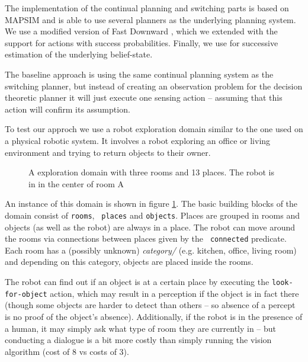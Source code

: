 

The implementation of the continual planning and switching parts is
based on MAPSIM \cite{brenner:nebel:jaamas09} and is able to use
several planners as the underlying planning system. We use a modified
version of Fast Downward \cite{fast-downward}, which we extended with
the support for actions with success probabilities. Finally, we use
 \cite{king:2009} for successive estimation of the
underlying belief-state.

The baseline approach is using the same continual planning system as
the switching planner, but instead of creating an observation problem
for the decision theoretic planner it will just execute one sensing
action -- assuming that this action will confirm its assumption.

To test our approch we use a robot exploration domain similar to the
one used on a physical robotic system. It involves a robot exploring
an office or living environment and trying to return objects to their
owner.

\begin{figure}[h]
  \centering
  
  \caption{A exploration domain with three rooms and 13 places. The
    robot is in in the center of room A}
\label{fig:dora2}
\end{figure}
An instance of this domain is shown in figure \ref{fig:dora2}. The
basic building blocks of the domain consist of {\tt rooms}, {\tt
  places} and {\tt objects}. Places are grouped in rooms and objects
(as well as the robot) are always in a place. The robot can move
around the rooms via connections between places given by the {\tt
  connected} predicate. Each room has a (possibly unknown) {\em
  category/} (e.g. kitchen, office, living room) and depending on this
category, objects are placed inside the rooms.

The robot can find out if an object is at a certain place by executing
the {\tt look-for-object} action, which may result in a perception if
the object is in fact there (though some objects are harder to detect
than others -- so absence of a percept is no proof of the object's
absence). Additionally, if the robot is in the presence of a human, it
may simply ask what type of room they are currently in -- but
conducting a dialogue is a bit more costly than simply running the
vision algorithm (cost of 8 vs costs of 3).

